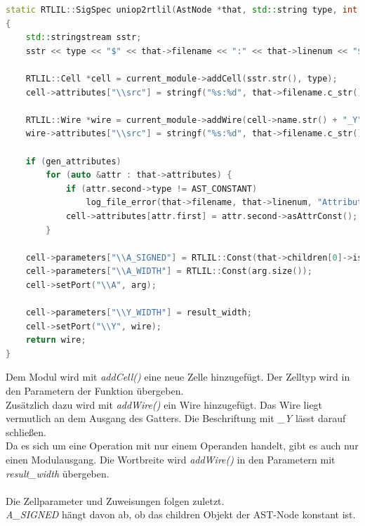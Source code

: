 \documentclass[11pt]{report}
\begin{document}
\begin{lstlisting}[language=C++]
static RTLIL::SigSpec uniop2rtlil(AstNode *that, std::string type, int result_width, const RTLIL::SigSpec &arg, bool gen_attributes = true)
{
	std::stringstream sstr;
	sstr << type << "$" << that->filename << ":" << that->linenum << "$" << (autoidx++);

	RTLIL::Cell *cell = current_module->addCell(sstr.str(), type);
	cell->attributes["\\src"] = stringf("%s:%d", that->filename.c_str(), that->linenum);

	RTLIL::Wire *wire = current_module->addWire(cell->name.str() + "_Y", result_width);
	wire->attributes["\\src"] = stringf("%s:%d", that->filename.c_str(), that->linenum);

	if (gen_attributes)
		for (auto &attr : that->attributes) {
			if (attr.second->type != AST_CONSTANT)
				log_file_error(that->filename, that->linenum, "Attribute `%s' with non-constant value!\n", attr.first.c_str());
			cell->attributes[attr.first] = attr.second->asAttrConst();
		}

	cell->parameters["\\A_SIGNED"] = RTLIL::Const(that->children[0]->is_signed);
	cell->parameters["\\A_WIDTH"] = RTLIL::Const(arg.size());
	cell->setPort("\\A", arg);

	cell->parameters["\\Y_WIDTH"] = result_width;
	cell->setPort("\\Y", wire);
	return wire;
}	
\end{lstlisting}
Dem Modul wird mit \textit{addCell()} eine neue Zelle hinzugefügt. Der Zelltyp wird in den Parametern der Funktion übergeben. \\
Zusätzlich dazu wird mit \textit{addWire()} ein Wire hinzugefügt. Das Wire liegt vermutlich an dem Ausgang des Gatters. Die Beschriftung mit \textit{\_Y} lässt darauf schließen.\\
Da es sich um eine Operation mit nur einem Operanden handelt, gibt es auch nur einen Modulausgang. Die Wortbreite wird \textit{addWire()} in den Parametern mit \textit{result\_width} übergeben.
\\
\\
Die Zellparameter und Zuweisungen folgen zuletzt.\\
\textit{A\_SIGNED} hängt davon ab, ob das children Objekt der AST-Node konstant ist. \\
\end{document}
